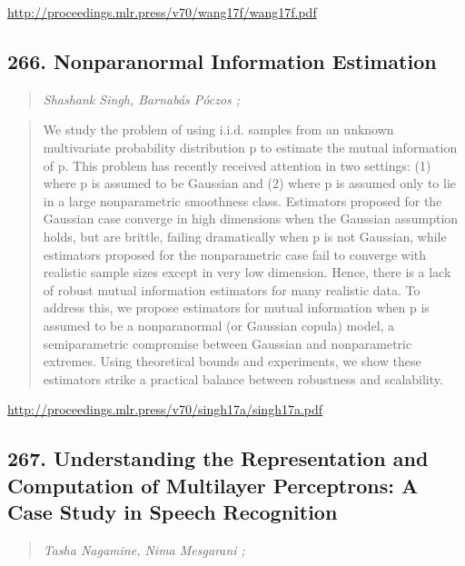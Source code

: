 \documentclass{article}
\begin{document}
\href{http://proceedings.mlr.press/v70/wang17f/wang17f.pdf}{http://proceedings.mlr.press/v70/wang17f/wang17f.pdf}

\subsection{266. Nonparanormal Information Estimation}

\begin{quote}
\footnotesize{\textit{Shashank Singh, Barnabás Póczos ;}}

\end{quote}

\begin{quote}
    We study the problem of using i.i.d. samples from an unknown multivariate probability distribution p to estimate the mutual information of p. This problem has recently received attention in two settings: (1) where p is assumed to be Gaussian and (2) where p is assumed only to lie in a large nonparametric smoothness class. Estimators proposed for the Gaussian case converge in high dimensions when the Gaussian assumption holds, but are brittle, failing dramatically when p is not Gaussian, while estimators proposed for the nonparametric case fail to converge with realistic sample sizes except in very low dimension. Hence, there is a lack of robust mutual information estimators for many realistic data. To address this, we propose estimators for mutual information when p is assumed to be a nonparanormal (or Gaussian copula) model, a semiparametric compromise between Gaussian and nonparametric extremes. Using theoretical bounds and experiments, we show these estimators strike a practical balance between robustness and scalability.  
\end{quote}

\href{http://proceedings.mlr.press/v70/singh17a/singh17a.pdf}{http://proceedings.mlr.press/v70/singh17a/singh17a.pdf}

\subsection{267. Understanding the Representation and Computation of Multilayer Perceptrons: A Case Study in Speech Recognition}

\begin{quote}
\footnotesize{\textit{Tasha Nagamine, Nima Mesgarani ;}}

\end{quote}
\end{document}
